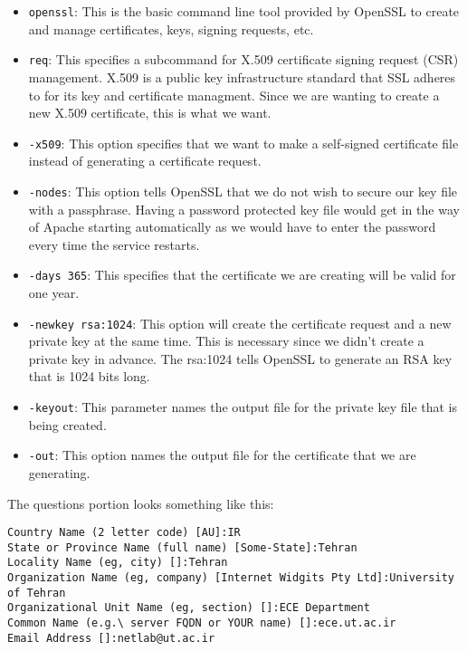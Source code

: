 \documentclass{../UTNetLab}
\begin{document}
        \begin{itemize}
            \item \lstinline{openssl}: This is the basic command line tool provided by OpenSSL to create and manage certificates, keys, signing requests, etc.
            \item \lstinline{req}: This specifies a subcommand for X.509 certificate signing request (CSR) management. X.509 is a public key infrastructure standard that SSL adheres to for its key and certificate managment. Since we are wanting to create a new X.509 certificate, this is what we want.
            \item \lstinline{-x509}: This option specifies that we want to make a self-signed certificate file instead of generating a certificate request.
            \item \lstinline{-nodes}: This option tells OpenSSL that we do not wish to secure our key file with a passphrase. Having a password protected key file would get in the way of Apache starting automatically as we would have to enter the password every time the service restarts.
            \item \lstinline{-days 365}: This specifies that the certificate we are creating will be valid for one year.
            \item \lstinline{-newkey rsa:1024}: This option will create the certificate request and a new private key at the same time. This is necessary since we didn't create a private key in advance. The rsa:1024 tells OpenSSL to generate an RSA key that is 1024 bits long.
            \item \lstinline{-keyout}: This parameter names the output file for the private key file that is being created.
            \item \lstinline{-out}: This option names the output file for the certificate that we are generating.    
        \end{itemize}

    The questions portion looks something like this:
    {\small
    \begin{verbatim}
Country Name (2 letter code) [AU]:IR 
State or Province Name (full name) [Some-State]:Tehran 
Locality Name (eg, city) []:Tehran 
Organization Name (eg, company) [Internet Widgits Pty Ltd]:University of Tehran 
Organizational Unit Name (eg, section) []:ECE Department 
Common Name (e.g.\ server FQDN or YOUR name) []:ece.ut.ac.ir 
Email Address []:netlab@ut.ac.ir 
    \end{verbatim}}
\end{document}
